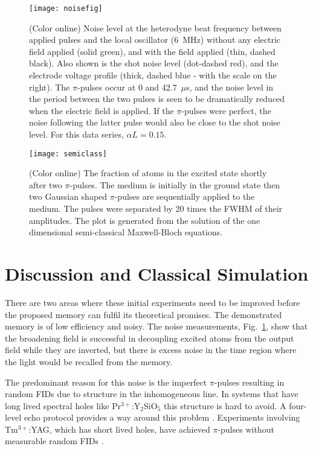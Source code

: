 \documentclass[superscriptaddress,pra,twocolumn,showpacs,amsmath,amssymb,aps,a4paper]{revtex4}
\newcommand{\PRYSO}{Pr$^{3+}$:Y$_2$SiO$_5$ }
\begin{document}
\begin{figure}[h]
	\centering
	\texttt{[image: noisefig]}
        \caption{(Color online) Noise level at the heterodyne beat
          frequency between applied pulses and the local oscillator
          (6~MHz) without any electric field applied (solid green), and with
          the field applied (thin, dashed black).  Also shown is the shot noise
          level (dot-dashed red), and the electrode voltage profile (thick, dashed blue - with
          the scale on the right).  The $\pi$-pulses occur at 0 and
          42.7~$\mu$s, and the noise level in the period between the
          two pulses is seen to be dramatically reduced when the
          electric field is applied.  If the $\pi$-pulses were
          perfect, the noise following the latter pulse would also be
          close to the shot noise level.  For this data series,
          ${\alpha}L=0.15$.  }
\label{fig:NoiseFig}
\end{figure}




\begin{figure}
  \centering
  \texttt{[image: semiclass]}
  \caption{\label{fig:semiclass}(Color online) The fraction of  atoms
    in the excited state shortly after two $\pi$-pulses. The medium is
    initially in the ground state then two Gaussian shaped
    $\pi$-pulses are sequentially applied to the medium. The pulses
    were separated by 20 times the FWHM of their amplitudes. The plot
    is generated from the solution of the one dimensional semi-classical Maxwell-Bloch equations.}
\end{figure}


\section{Discussion and Classical Simulation}

There are two areas where these initial experiments need to be
improved before the proposed memory can fulfil its theoretical
promises. The demonstrated memory is of low efficiency and noisy. The
noise measurements, Fig.~\ref{fig:NoiseFig}, show that the broadening field is
successful in decoupling excited atoms from the output field while they
are inverted, but there is excess noise in the time region where the light would be
recalled from the memory. 

The predominant reason for this noise is the imperfect $\pi$-pulses
resulting in random FIDs due to structure in the
inhomogeneous line. In systems that have long lived spectral holes
like \PRYSO this structure is hard to avoid. A four-level echo
protocol provides a way around this problem \cite{beav11}. Experiments
involving Tm$^{3+}$:YAG, which has short lived holes, have achieved $\pi$-pulses 
without measurable random FIDs
\cite{ledingham_in_prep}.
\end{document}
